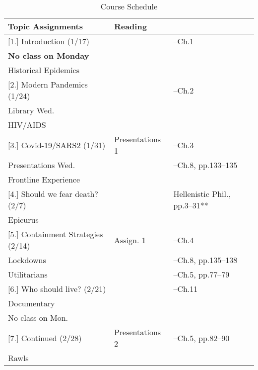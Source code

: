 \documentclass[article,oneside]{memoir}
\begin{document}
\newpage
\begin{landscape}
\begin{center}
\begin{longtable}{p{6cm}p{6cm}p{4cm}}
 
  \caption{Course Schedule} \\
  \toprule
  \textbf{Topic}    \textbf{Assignments} & \textbf{Reading} \\
  \midrule

  
[1.] Introduction (1/17) 						& 				&  --Ch.1 \\ 
\textbf{No class on Monday}					&				&   \\
Historical Epidemics							&				& \\
[1.8\baselineskip] \hline


[2.] Modern Pandemics (1/24)	  				&  				& --Ch.2\\
Library Wed.					 			&				&  \\ 
HIV/AIDS					  	 			& 	 			& \\ [1.8\baselineskip] \hline



[3.] Covid-19/SARS2 (1/31)					& Presentations 1		& --Ch.3   \\ 
Presentations Wed.							& 					& --Ch.8, pp.133--135\\ 
Frontline Experience							& 					& \\[1.8\baselineskip]  \hline 

[4.] Should we fear death? (2/7)  				&     	 				&  Hellenistic Phil., pp.3–31** \\
Epicurus					  				& 					&  \\ [1.8\baselineskip]  \hline %


[5.] Containment Strategies (2/14)				& Assign. 1 			&  --Ch.4  \\
Lockdowns			    	    	 			&					&  --Ch.8, pp.135--138  \\ 
Utilitarians		    	    			 			&					&  --Ch.5, pp.77--79 \\  [1.8\baselineskip]  \hline 

[6.] Who should live?  (2/21)	   	 			&     					&  --Ch.11 \\
Documentary								&					&	 \\
No class on Mon.			     				&					&  	 \\ [1.8\baselineskip]  \hline 

[7.] Continued (2/28)							& Presentations 2		&  --Ch.5, pp.82--90 \\
Rawls							 		&	  				& \\  [1.8\baselineskip]  \hline


\end{longtable}
\end{center}
\end{landscape}
\end{document}
